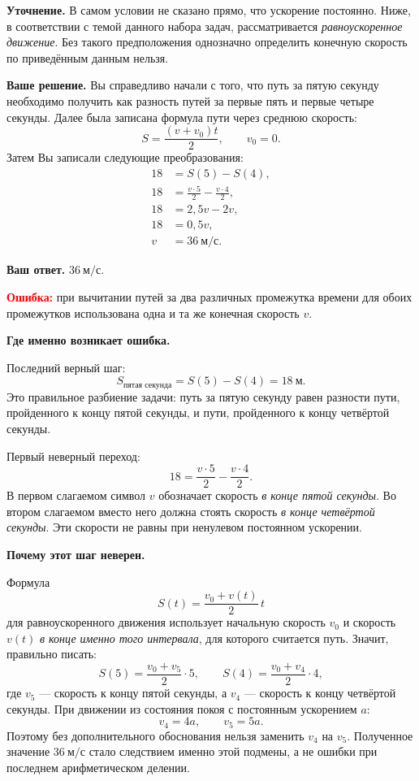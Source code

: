 \documentclass[12pt,a4paper]{article}
\begin{document}
\textbf{Уточнение.} В самом условии не сказано прямо, что ускорение постоянно. Ниже, в соответствии с темой данного набора задач, рассматривается \emph{равноускоренное движение}. Без такого предположения однозначно определить конечную скорость по приведённым данным нельзя.

\textbf{Ваше решение.} Вы справедливо начали с того, что путь за пятую секунду необходимо получить как разность путей за первые пять и первые четыре секунды. Далее была записана формула пути через среднюю скорость:
\[
S=\frac{(v+v_0)t}{2},\qquad v_0=0.
\]
Затем Вы записали следующие преобразования:
\[
\begin{aligned}
18&=S(5)-S(4),\\
18&=\frac{v\cdot5}{2}-\frac{v\cdot4}{2},\\
18&=2{,}5v-2v,\\
18&=0{,}5v,\\
v&=36\ \text{м/с}.
\end{aligned}
\]

\textbf{Ваш ответ.} $36\ \text{м/с}$.

\textcolor{red}{\textbf{Ошибка:}} при вычитании путей за два различных промежутка времени для обоих промежутков использована одна и та же конечная скорость $v$.

\textbf{Где именно возникает ошибка.}

Последний верный шаг:
\[
\boxed{S_{\text{пятая секунда}}=S(5)-S(4)=18\ \text{м}.}
\]
Это правильное разбиение задачи: путь за пятую секунду равен разности пути, пройденного к концу пятой секунды, и пути, пройденного к концу четвёртой секунды.

Первый неверный переход:
\[
\boxed{18=\frac{v\cdot5}{2}-\frac{v\cdot4}{2}.}
\]
В первом слагаемом символ $v$ обозначает скорость \emph{в конце пятой секунды}. Во втором слагаемом вместо него должна стоять скорость \emph{в конце четвёртой секунды}. Эти скорости не равны при ненулевом постоянном ускорении.

\textbf{Почему этот шаг неверен.}

Формула
\[
S(t)=\frac{v_0+v(t)}{2}\,t
\]
для равноускоренного движения использует начальную скорость $v_0$ и скорость $v(t)$ \emph{в конце именно того интервала}, для которого считается путь. Значит, правильно писать:
\[
S(5)=\frac{v_0+v_5}{2}\cdot5,
\qquad
S(4)=\frac{v_0+v_4}{2}\cdot4,
\]
где $v_5$ --- скорость к концу пятой секунды, а $v_4$ --- скорость к концу четвёртой секунды. При движении из состояния покоя с постоянным ускорением $a$:
\[
v_4=4a,\qquad v_5=5a.
\]
Поэтому без дополнительного обоснования нельзя заменить $v_4$ на $v_5$. Полученное значение $36\ \text{м/с}$ стало следствием именно этой подмены, а не ошибки при последнем арифметическом делении.
\end{document}
